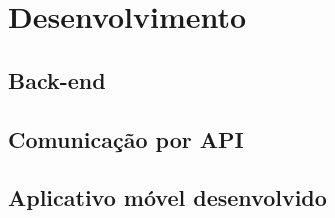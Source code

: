 \chapter{Desenvolvimento}

\section{Back-end}

\lipsum[1-2]

\section{Comunicação por API}

\lipsum[1-2]

\section{Aplicativo móvel desenvolvido}


\lipsum[1-2]